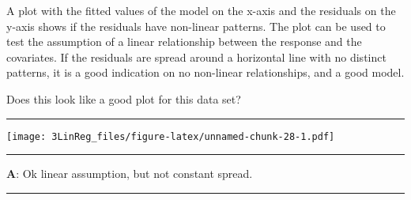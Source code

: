 \documentclass[]{article}
\newenvironment{Shaded}{\begin{snugshade}}{\end{snugshade}}
\newcommand{\DataTypeTok}[1]{\textcolor[rgb]{0.13,0.29,0.53}{#1}}
\newcommand{\DecValTok}[1]{\textcolor[rgb]{0.00,0.00,0.81}{#1}}
\newcommand{\FloatTok}[1]{\textcolor[rgb]{0.00,0.00,0.81}{#1}}
\newcommand{\KeywordTok}[1]{\textcolor[rgb]{0.13,0.29,0.53}{\textbf{#1}}}
\newcommand{\NormalTok}[1]{#1}
\newcommand{\OperatorTok}[1]{\textcolor[rgb]{0.81,0.36,0.00}{\textbf{#1}}}
\newcommand{\OtherTok}[1]{\textcolor[rgb]{0.56,0.35,0.01}{#1}}
\newcommand{\StringTok}[1]{\textcolor[rgb]{0.31,0.60,0.02}{#1}}
\begin{document}
A plot with the fitted values of the model on the x-axis and the
residuals on the y-axis shows if the residuals have non-linear patterns.
The plot can be used to test the assumption of a linear relationship
between the response and the covariates. If the residuals are spread
around a horizontal line with no distinct patterns, it is a good
indication on no non-linear relationships, and a good model.

Does this look like a good plot for this data set?

\begin{center}\rule{0.5\linewidth}{\linethickness}\end{center}

\footnotesize

\begin{Shaded}
\end{Shaded}

\texttt{[image: 3LinReg\_files/figure-latex/unnamed-chunk-28-1.pdf]}
\normalsize

\begin{center}\rule{0.5\linewidth}{\linethickness}\end{center}

\textbf{A}: Ok linear assumption, but not constant spread.

\begin{center}\rule{0.5\linewidth}{\linethickness}\end{center}
\end{document}
